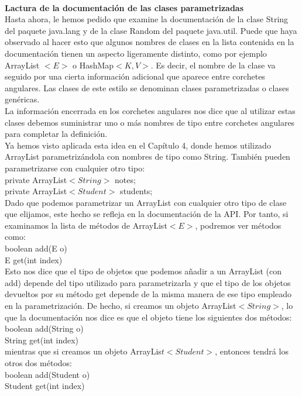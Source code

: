 \documentclass[11pt,a4paper]{article}
\begin{document}
	\\
	\textbf{Lactura de la documentación de las clases parametrizadas}\\
	Hasta ahora, le hemos pedido que examine la documentación de la clase String del paquete
	java.lang y de la clase Random del paquete java.util. Puede que haya observado al hacer
	esto que algunos nombres de clases en la lista contenida en la documentación tienen un aspecto
	ligeramente distinto, como por ejemplo ArrayList $<E>$ o HashMap$<K,V>$. Es decir, el nombre
	de la clase va seguido por una cierta información adicional que aparece entre corchetes angulares.
	Las clases de este estilo se denominan clases parametrizadas o clases genéricas.\\
	La información encerrada en los corchetes angulares nos dice que al utilizar estas clases debemos suministrar uno
	o más nombres de tipo entre corchetes angulares para completar la definición.\\
	Ya hemos visto aplicada
	esta idea en el Capítulo 4, donde hemos utilizado ArrayList parametrizándola con nombres
	de tipo como String. También pueden parametrizarse con cualquier otro tipo:\\
	private ArrayList$<String>$ notes;	
	 \\
	 private ArrayList$<Student>$ students;
	\\
	Dado que podemos parametrizar un ArrayList con cualquier otro tipo de clase que elijamos, este
	hecho se refleja en la documentación de la API. Por tanto, si examinamos la lista de métodos de
	ArrayList$<E>$, podremos ver métodos como:\\
	boolean add(E o)\\
	E get(int index)\\
	Esto nos dice que el tipo de objetos que podemos añadir a un ArrayList (con add) depende
	del tipo utilizado para parametrizarla y que el tipo de los objetos devueltos por su método get
	depende de la misma manera de ese tipo empleado en la parametrización. De hecho, si creamos un
	objeto ArrayList$<String>$, lo que la documentación nos dice es que el objeto tiene los siguientes
	dos métodos:\\
	boolean add(String o)\\
	String get(int index)\\
	mientras que si creamos un objeto ArrayLis$t<Student>$, entonces tendrá los otros dos métodos:\\
	boolean add(Student o)\\
	Student get(int index)\\
	\\
\end{document}
